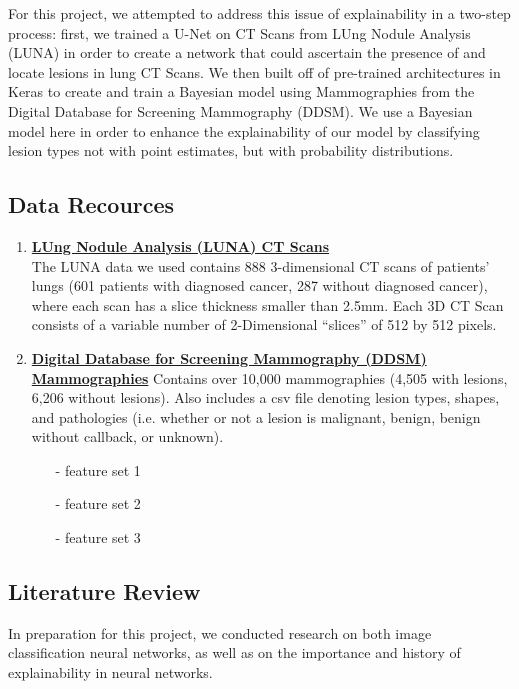 \documentclass[12pt]{article}
\begin{document}
{For this project, we attempted to address this issue of explainability in a two-step process: first, we trained a U-Net on CT Scans from LUng Nodule Analysis (LUNA) in order to create a network that could ascertain the presence of and locate lesions in lung CT Scans. We then built off of pre-trained architectures in Keras to create and train a Bayesian model using Mammographies from the Digital Database for Screening Mammography (DDSM). We use a Bayesian model here in order to enhance the explainability of our model by classifying lesion types not with point estimates, but with probability distributions. 

\subsection*{Data Recources}

\begin{enumerate}
\item \textbf{\href{https://wiki.cancerimagingarchive.net/display/Public/LIDC-IDRI}{LUng Nodule Analysis (LUNA) CT Scans}}\\
The LUNA data we used contains 888 3-dimensional CT scans of patients' lungs (601 patients with diagnosed cancer, 287 without diagnosed cancer), where each scan has a slice thickness smaller than 2.5mm. Each 3D CT Scan consists of a variable number of 2-Dimensional ``slices'' of 512 by 512 pixels. 

\item \textbf{\href{https://www.ncbi.nlm.nih.gov/pmc/articles/PMC3041807}{Digital Database for Screening Mammography (DDSM) Mammographies}}
Contains over 10,000 mammographies (4,505 with lesions, 6,206 without lesions). Also includes a csv file denoting lesion types, shapes, and pathologies (i.e. whether or not a lesion is malignant, benign, benign without callback, or unknown). 

\begin{itemize}
\item[-] feature set 1
\item[-] feature set 2
\item[-] feature set 3
\end{itemize}
\end{enumerate}

\subsection*{Literature Review}

In preparation for this project, we conducted research on both image classification neural networks, as well as on the importance and history of explainability in neural networks.

}
\end{document}
